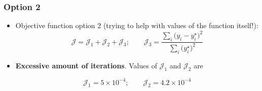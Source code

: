 \begin{frame}
	\frametitle[]{Option 2  \hspace{8cm}}
	\footnotesize
	
	\vspace{0mm}
	
	\begin{itemize}
		\item Objective function option 2 (trying to help with values of the function itself!):
		\begin{equation*}
			\boxed{\mathcal{J}  =  \mathcal{J}_1 + 
				\mathcal{J}_2 + \mathcal{J}_3;\qquad 	\mathcal{J}_3=	\frac{\sum_i \Big(y_i-y^{\star}_i\Big)^2}{\sum_i\Big(y^{\star}_i\Big)^2}}
		\end{equation*}
		
		
		\begin{center}
			
		\end{center}				
		
		\item \textcolor[rgb]{1.0,0.0,0.0}{\textbf{Excessive amount of iterations}}. Values of $\mathcal{J}_1$	and $\mathcal{J}_2$ are
		
		\begin{equation*}
			\mathcal{J}_1  =  5\times 10^{-4};\qquad \mathcal{J}_2=4.2\times 10^{-4}
		\end{equation*}
		
	\end{itemize}		
	
	
\end{frame}



